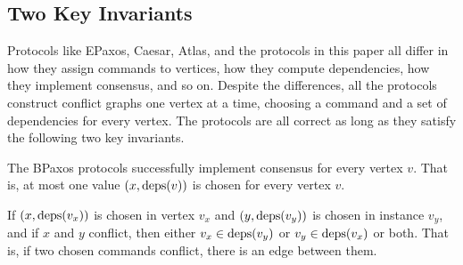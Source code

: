\subsection{Two Key Invariants}
Protocols like EPaxos, Caesar, Atlas, and the \BPaxos{} protocols in this paper
all differ in how they assign commands to vertices, how they compute
dependencies, how they implement consensus, and so on. Despite the differences,
all the protocols construct conflict graphs one vertex at a time, choosing a
command and a set of dependencies for every vertex. The protocols are all
correct as long as they satisfy the following two key invariants.

\begin{invariant}
  The BPaxos protocols successfully implement consensus for every vertex $v$.
  That is, at most one value $(x, \text{deps}(v))$ is chosen for every vertex $v$.
\end{invariant}%

\begin{invariant}
  If $(x, \text{deps}(v_x))$ is chosen in vertex $v_x$ and $(y, \text{deps}(v_y))$ is
  chosen in instance $v_y$, and if $x$ and $y$ conflict, then either $v_x \in
  \text{deps}(v_y)$ or $v_y \in \text{deps}(v_x)$ or both. That is, if two chosen commands
  conflict, there is an edge between them.
\end{invariant}

%
% 
